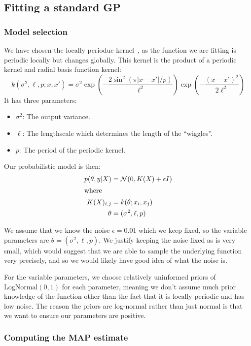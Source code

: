 \subsection{Fitting a standard GP}

\subsubsection{Model selection}

We have chosen the locally perioduc kernel~\cite[11]{duvenaud2014automatic},
as the function we are fitting is periodic locally but changes
globally. This kernel is the product of a periodic kernel and radial basis function kernel:
\[
  k( \sigma^2, \ell, p ; x, x')
  = \sigma^2
    \exp{\left(-\frac{2 \sin^2{(\pi | x - x' | / p)}}{\ell^2} \right)}
    \exp{\left( -\frac{(x - x')^2}{2 \ell^2} \right)}
\]
It has three parameters:
\begin{itemize}
  \item $\sigma^2$: The output variance.
  \item $\ell$: The lengthscale which determines the length of the \enquote{wiggles}.
  \item $p$: The period of the periodic kernel.
\end{itemize}
%
Our probabilistic model is then:
\begin{align*}
  p(\theta , y | X)
  &=
  \mathcal{N}(0, K(X) + \epsilon I)
  \\
\intertext{where}
  K(X)_{i,j} &= k(\theta ; x_i, x_j)
  \\
  \theta &= (\sigma^2, \ell, p)
\end{align*}

We assume that we know the noise $\epsilon = 0.01$ which we keep fixed,
so the variable parameters are $\theta = (\sigma^2, \ell, p)$.
We justify keeping the noise fixed as is very small,
which would suggest that we are able to sample the underlying function
very precisely, and so we would likely have good idea of what the noise is.

For the variable parameters, we choose relatively uninformed priors
of $\text{LogNormal}(0, 1)$ for each parameter, meaning we don't
assume much prior knowledge of the function other than the fact that
it is locally periodic and has low noise.
The reason the priors are log-normal rather than just normal
is that we want to ensure our parameters are positive.

\subsubsection{Computing the MAP estimate}

